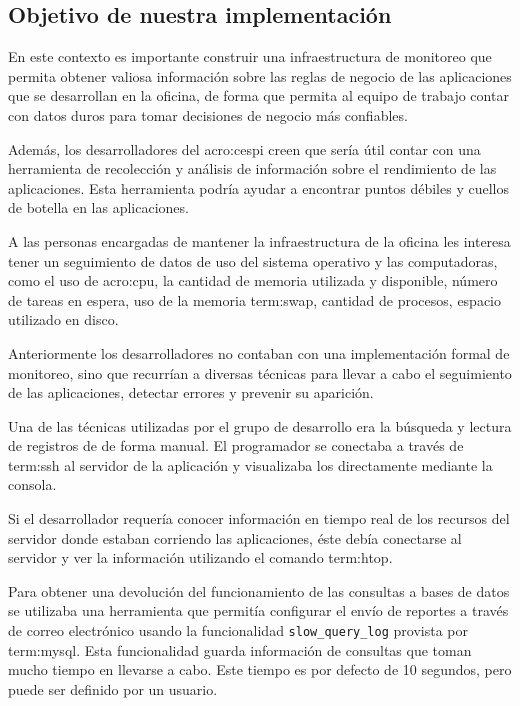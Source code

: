 \subsection{Objetivo de nuestra implementación}
\label{objetivos_de_nuestra_implementacion}

En este contexto es importante construir una infraestructura de monitoreo que
permita obtener valiosa información sobre las reglas de negocio de las
aplicaciones que se desarrollan en la oficina, de forma que permita al equipo
de trabajo contar con datos duros para tomar decisiones de negocio más
confiables.

Además, los desarrolladores del \gls{acro:cespi} creen que sería útil contar
con una herramienta de recolección y análisis de información sobre el
rendimiento de las aplicaciones. Esta herramienta podría ayudar a encontrar
puntos débiles y cuellos de botella en las aplicaciones.

A las personas encargadas de mantener la infraestructura de la oficina les
interesa tener un seguimiento de datos de uso del sistema operativo y las
computadoras, como el uso de \gls{acro:cpu}, la cantidad de memoria utilizada y
disponible, número de tareas en espera, uso de la memoria \gls{term:swap},
cantidad de procesos, espacio utilizado en disco.

Anteriormente los desarrolladores no contaban con una implementación formal de
monitoreo, sino que recurrían a diversas técnicas para llevar a cabo el
seguimiento de las aplicaciones, detectar errores y prevenir su aparición.

Una de las técnicas utilizadas por el grupo de desarrollo era la búsqueda y
lectura de registros de  de forma manual. El programador se conectaba
a través de \gls{term:ssh} al servidor de la aplicación y visualizaba los
 directamente mediante la consola.

Si el desarrollador requería conocer información en tiempo real de los recursos
del servidor donde estaban corriendo las aplicaciones, éste debía conectarse al
servidor y ver la información utilizando el comando \gls{term:htop}.

Para obtener una devolución del funcionamiento de las consultas a bases de
datos se utilizaba una herramienta que permitía configurar el envío de reportes
a través de correo electrónico usando la funcionalidad
\texttt{slow\_query\_log} provista por \gls{term:mysql}. Esta funcionalidad
guarda información de consultas que toman mucho tiempo en llevarse a cabo. Este
tiempo es por defecto de 10 segundos, pero puede ser definido por un usuario.


